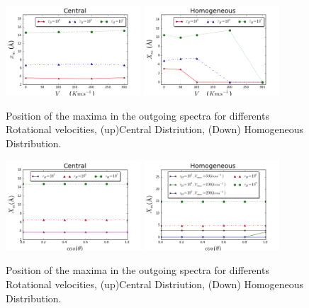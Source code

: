 \documentclass[usenatbib]{mn2e}
\begin{document}
\begin{figure}
    \includegraphics[width=0.45\textwidth]{maximumvsvelocitiesDifODCentral.png}
    \includegraphics[width=0.45\textwidth]{maximumvsvelocitiesDifODHOM.png}
\caption{Position of the maxima
    in the outgoing spectra for differents Rotational velocities,
    (up)Central Distriution, (Down) Homogeneous Distribution.\label{fig:maximumsvsvelocity}} 
\end{figure}

\begin{figure}
    \includegraphics[width=0.45\textwidth]{maximumvscosthetaHOMSameSpeed.png}
    \includegraphics[width=0.45\textwidth]{maximumvscosthetaDifSpeedCentral.png}
\caption{Position of the maxima
    in the outgoing spectra for differents Rotational velocities,
    (up)Central Distriution, (Down) Homogeneous Distribution.\label{fig:maximumsvsvelocity}} 
\end{figure}
\end{document}
